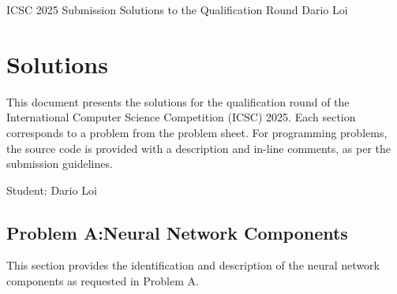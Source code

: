 \documentclass{solutionclass} %
\begin{document}
\pretitle%
{ICSC 2025 Submission}                          %
{Solutions to the Qualification Round}          %
{Dario Loi} %

\makeatletter
    \startcontents[sections]
    \chapter{Solutions}
\makeatother

    This document presents the solutions for the qualification round of the International Computer Science Competition (ICSC) 2025. Each section corresponds to a problem from the problem sheet. For programming problems, the source code is provided with a description and in-line comments, as per the submission guidelines.

    Student: Dario Loi\\
    \divider%

    \section{Problem A:\@ Neural Network Components}
    This section provides the identification and description of the neural network components as requested in Problem A.
\end{document}
